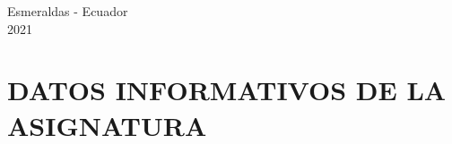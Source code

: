 \documentclass[a4pa<per,12pt,spanish]{article}
\begin{document}
\begin{titlepage}
{{\begin{minipage}[H]{0.3\linewidth}
\begin{center}
   \vspace{6.5cm}
  \end{center}
 
  
  \begin{center}
  {\large Esmeraldas - Ecuador \\ 2021\par}
\end{center}
\vspace{1.8cm}
\end{minipage}
}
}




\end{titlepage}




\section{DATOS INFORMATIVOS DE LA ASIGNATURA}
\end{document}
